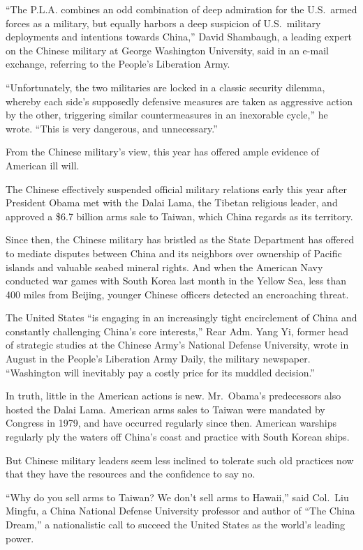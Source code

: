 ﻿\documentclass[12pt]{article}
\begin{document}
``The P.L.A. combines an odd combination of deep admiration for the U.S.~armed forces as a military,
but equally harbors a deep suspicion of U.S.~military deployments and intentions towards China,''
David Shambaugh, a leading expert on the Chinese military at George Washington University, said in
an e-mail exchange, referring to the People's Liberation Army.

``Unfortunately, the two militaries are locked in a classic security dilemma, whereby each side's
supposedly defensive measures are taken as aggressive action by the other, triggering similar
countermeasures in an inexorable cycle,'' he wrote. ``This is very dangerous, and unnecessary.''

From the Chinese military's view, this year has offered ample evidence of American ill will.

The Chinese effectively suspended official military relations early this year after President Obama
met with the Dalai Lama, the Tibetan religious leader, and approved a \$6.7 billion arms sale to
Taiwan, which China regards as its territory.

Since then, the Chinese military has bristled as the State Department has offered to mediate
disputes between China and its neighbors over ownership of Pacific islands and valuable seabed
mineral rights. And when the American Navy conducted war games with South Korea last month in the
Yellow Sea, less than 400 miles from Beijing, younger Chinese officers detected an encroaching
threat.

The United States ``is engaging in an increasingly tight encirclement of China and constantly
challenging China's core interests,'' Rear Adm. Yang Yi, former head of strategic studies at the
Chinese Army's National Defense University, wrote in August in the People's Liberation Army Daily,
the military newspaper. ``Washington will inevitably pay a costly price for its muddled decision.''

In truth, little in the American actions is new. Mr.~Obama's predecessors also hosted the Dalai
Lama. American arms sales to Taiwan were mandated by Congress in 1979, and have occurred regularly
since then. American warships regularly ply the waters off China's coast and practice with South
Korean ships.

But Chinese military leaders seem less inclined to tolerate such old practices now that they have
the resources and the confidence to say no.

``Why do you sell arms to Taiwan? We don't sell arms to Hawaii,'' said Col.~Liu Mingfu, a China
National Defense University professor and author of ``The China Dream,'' a nationalistic call to
succeed the United States as the world's leading power.
\end{document}

